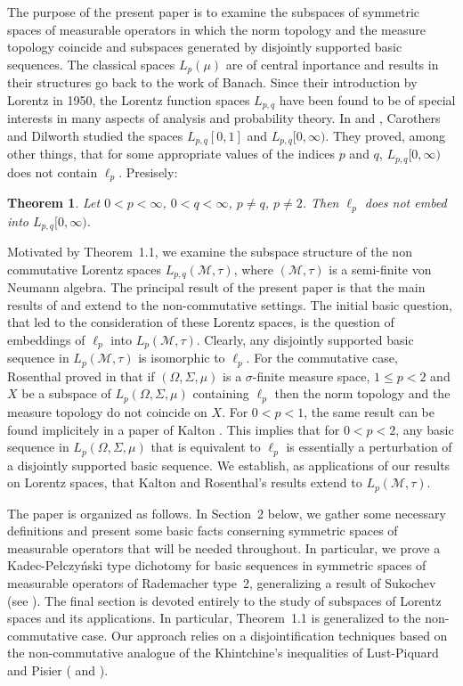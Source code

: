 \documentclass[12pt]{amsart}
\let\cal\mathcal
\newtheorem{theorem}{Theorem}
\def\m{{\cal M}}
\def\M{{\cal M}}
\numberwithin{equation}{section}
\numberwithin{theorem}{section}
\begin{document}
The purpose of the present paper is to examine the subspaces
of symmetric spaces of measurable operators in which the norm topology and 
the measure topology coincide and subspaces generated by disjointly
supported basic sequences.
The classical spaces $L_p(\mu)$ are of central
inportance and  
results in their  structures go back to  the work of Banach.
Since their introduction by Lorentz in 1950, the Lorentz function 
spaces $L_{p,q}$ have been found to be of special interests in many aspects
of analysis and probability theory. In \cite{CADI2} and \cite{CADI}, 
Carothers and Dilworth
studied the spaces $L_{p,q}[0,1]$ and $L_{p,q}[0,\infty)$. They proved, 
among other things, that for some appropriate values of the indices 
$p$ and $q$,  $L_{p,q}[0,\infty)$ does not contain $\ell_p$. Presisely:
\begin{theorem}
Let $0<p<\infty$, $0<q<\infty$, $p\neq q$, $p\neq 2$. 
Then $\ell_p$ does not embed
into $L_{p,q}[0,\infty)$.
\end{theorem}
Motivated 
by  Theorem~1.1, we examine the subspace
 structure of 
the  non commutative Lorentz spaces $L_{p,q}(\M,\tau)$, where $(\M,\tau)$ is 
a semi-finite von 
Neumann algebra. The principal result of the present paper is that the main
results of \cite{CADI2} and \cite{CADI} extend  to the non-commutative 
settings.
 The initial basic question, that led to the consideration of these
Lorentz spaces, is the question of embeddings of $\ell_p$ into 
$L_p(\cal M, \tau)$. Clearly, any disjointly supported basic sequence in
$L_p(\cal M, \tau)$ is isomorphic to $\ell_p$. For the commutative case,
Rosenthal proved in \cite{R6} that  if $(\Omega,\Sigma,\mu)$ is a 
$\sigma$-finite measure space, $1\leq p <2$ and $X$ be a subspace of 
$L_p(\Omega,\Sigma,\mu)$ containing $\ell_p$ then the norm topology
and the measure topology do not coincide on $X$. For $0<p<1$, 
the same result can be
found implicitely in a paper of Kalton \cite{KA3}.
This implies that for $0<p<2$, any basic sequence in 
$L_p(\Omega,\Sigma,\mu)$ that is equivalent to $\ell_p$
is essentially a perturbation of a disjointly supported  basic sequence. 
We establish, as applications of our results on Lorentz spaces, that 
Kalton and Rosenthal's results extend to  $L_p(\m, \tau)$.

The paper is organized as follows. In Section~2 below, we gather some 
necessary definitions and present some basic facts conserning symmetric 
spaces of measurable operators that will be needed throughout.
In particular, we prove a Kadec-Pe\l czy\'nski type dichotomy for 
basic sequences in symmetric
spaces of measurable operators  of Rademacher type~2, generalizing a
result of Sukochev (see \cite{SU}). The final section is devoted entirely
to the study of subspaces of Lorentz spaces and its applications. 
In particular, Theorem~1.1 is generalized to the non-commutative case.
Our approach relies on a disjointification techniques based on the 
non-commutative analogue of the Khintchine's inequalities  of
Lust-Piquard and Pisier (\cite{LP4} and \cite{LPI}).
\end{document}
